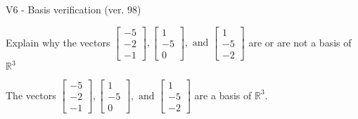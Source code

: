 \begin{exercise}
  \begin{exerciseTitle}V6 - Basis verification (ver. 98)\end{exerciseTitle}
  \begin{exerciseStatement}
    Explain why the vectors \(\left[\begin{array}{r}
-5 \\
-2 \\
-1
\end{array}\right] , \left[\begin{array}{r}
1 \\
-5 \\
0
\end{array}\right] , \text{ and } \left[\begin{array}{r}
1 \\
-5 \\
-2
\end{array}\right]\) are or are not a basis of \(\mathbb{R}^3\)	


  \end{exerciseStatement}
  \begin{exerciseAnswer}
   The vectors \(\left[\begin{array}{r}
-5 \\
-2 \\
-1
\end{array}\right] , \left[\begin{array}{r}
1 \\
-5 \\
0
\end{array}\right] , \text{ and } \left[\begin{array}{r}
1 \\
-5 \\
-2
\end{array}\right]\) 
  	 are  a basis of \(\mathbb{R}^3\).
  


  \end{exerciseAnswer}
\end{exercise}